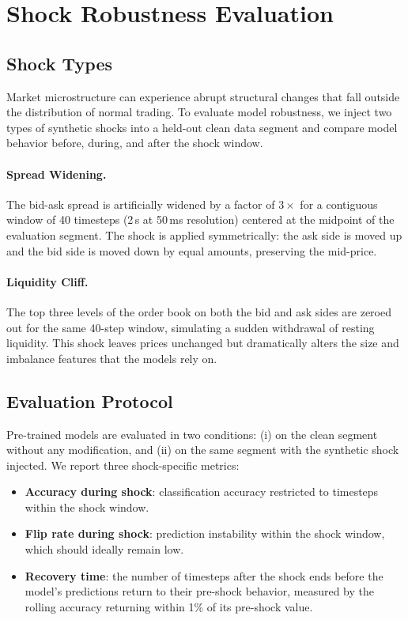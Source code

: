 \documentclass[11pt]{article}
\begin{document}
\section{Shock Robustness Evaluation}
\label{sec:shocks}

\subsection{Shock Types}

Market microstructure can experience abrupt structural changes that fall
outside the distribution of normal trading. To evaluate model robustness, we
inject two types of synthetic shocks into a held-out clean data segment and
compare model behavior before, during, and after the shock window.

\paragraph{Spread Widening.}
The bid-ask spread is artificially widened by a factor of $3\times$ for a
contiguous window of 40 timesteps (2\,s at 50\,ms resolution) centered at
the midpoint of the evaluation segment. The shock is applied symmetrically:
the ask side is moved up and the bid side is moved down by equal amounts,
preserving the mid-price.

\paragraph{Liquidity Cliff.}
The top three levels of the order book on both the bid and ask sides are
zeroed out for the same 40-step window, simulating a sudden withdrawal of
resting liquidity. This shock leaves prices unchanged but dramatically
alters the size and imbalance features that the models rely on.

\subsection{Evaluation Protocol}

Pre-trained models are evaluated in two conditions: (i) on the clean segment
without any modification, and (ii) on the same segment with the synthetic
shock injected. We report three shock-specific metrics:
\begin{itemize}
  \item \textbf{Accuracy during shock}: classification accuracy restricted to
    timesteps within the shock window.
  \item \textbf{Flip rate during shock}: prediction instability within the
    shock window, which should ideally remain low.
  \item \textbf{Recovery time}: the number of timesteps after the shock ends
    before the model's predictions return to their pre-shock behavior, measured
    by the rolling accuracy returning within 1\% of its pre-shock value.
\end{itemize}
\end{document}
